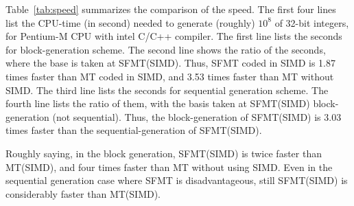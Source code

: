 \documentclass[acmnow]{acmtrans2m}
\begin{document}
Table~\ref{tab:speed} summarizes the comparison of 
the speed. The first four lines list the CPU-time
(in second) needed to generate (roughly) $10^8$ of
32-bit integers, for Pentium-M CPU with intel C/C++
compiler. The first line lists the seconds for
block-generation scheme. The second line shows the 
ratio of the seconds, where the base is taken at 
SFMT(SIMD). Thus, SFMT coded in SIMD is 1.87 times
faster than MT coded in SIMD, and 3.53 times faster
than MT without SIMD. The third line lists the seconds
for sequential generation scheme. The fourth line
lists the ratio of them, with the basis taken
at SFMT(SIMD) block-generation (not sequential). 
Thus, the block-generation of SFMT(SIMD) is 3.03 times
faster than the sequential-generation of SFMT(SIMD).

Roughly saying, in the block generation, 
SFMT(SIMD) is twice faster than MT(SIMD),
and four times faster than MT without using SIMD.
Even in the sequential generation case
where SFMT is
disadvantageous,
still SFMT(SIMD) is considerably faster than MT(SIMD).
\end{document}
